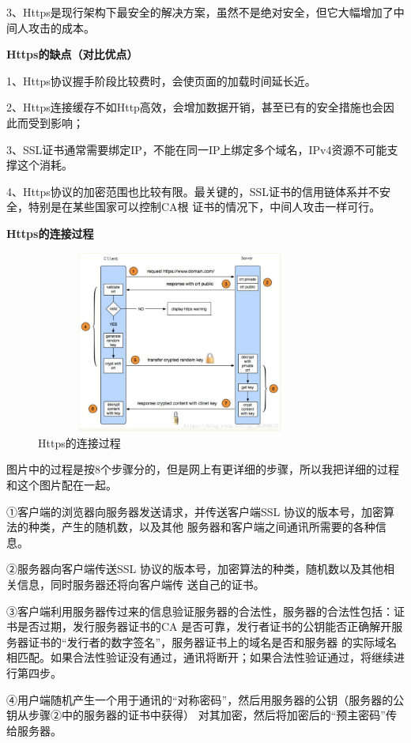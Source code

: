 \documentclass[UTF8]{ctexart}
\begin{document}
3、Https是现行架构下最安全的解决方案，虽然不是绝对安全，但它大幅增加了中间人攻击的成本。

\textbf{Https的缺点（对比优点）}

1、Https协议握手阶段比较费时，会使页面的加载时间延长近。

2、Https连接缓存不如Http高效，会增加数据开销，甚至已有的安全措施也会因此而受到影响；

3、SSL证书通常需要绑定IP，不能在同一IP上绑定多个域名，IPv4资源不可能支撑这个消耗。

4、Https协议的加密范围也比较有限。最关键的，SSL证书的信用链体系并不安全，特别是在某些国家可以控制CA根
证书的情况下，中间人攻击一样可行。

\textbf{Https的连接过程}

\begin{figure}[htbp]
\centering
\includegraphics[height=6.0cm,width=9.5cm]{Figure/20180709141944471.jpg}
\caption{Https的连接过程}
\end{figure}
图片中的过程是按8个步骤分的，但是网上有更详细的步骤，所以我把详细的过程和这个图片配在一起。

①客户端的浏览器向服务器发送请求，并传送客户端SSL 协议的版本号，加密算法的种类，产生的随机数，以及其他
服务器和客户端之间通讯所需要的各种信息。

②服务器向客户端传送SSL 协议的版本号，加密算法的种类，随机数以及其他相关信息，同时服务器还将向客户端传
送自己的证书。

③客户端利用服务器传过来的信息验证服务器的合法性，服务器的合法性包括：证书是否过期，发行服务器证书的CA
 是否可靠，发行者证书的公钥能否正确解开服务器证书的“发行者的数字签名”，服务器证书上的域名是否和服务器
 的实际域名相匹配。如果合法性验证没有通过，通讯将断开；如果合法性验证通过，将继续进行第四步。

④用户端随机产生一个用于通讯的“对称密码”，然后用服务器的公钥（服务器的公钥从步骤②中的服务器的证书中获得）
对其加密，然后将加密后的“预主密码”传给服务器。
\end{document}
